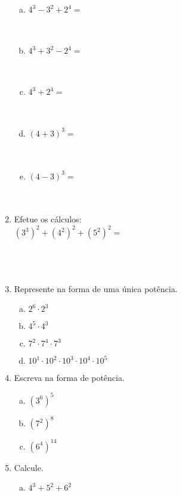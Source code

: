\documentclass[a4paper,14pt]{article}
\begin{document}
\begin{multicols}{2}
\begin{enumerate}
\begin{enumerate}[a)]
            	\item $4^3 - 3^2 + 2^4 = $ \\\\\\
            	\item $4^3 + 3^2 - 2^4 = $ \\\\\\
            	\item $4^3 + 2^4 = $ \\\\\\
            	\item $(4 + 3)^3 = $ \\\\\\
            	\item $(4 - 3)^3 = $ \\\\\\
            \end{enumerate}
            \item Efetue os cálculos: \\
            $(3^3)^2 + (4^2)^2 + (5^2)^2 = $ \\\\\\\\
            \item Represente na forma de uma única potência.
            \begin{enumerate}[a)]
            	\item $2^6 \cdot 2^3$
            	\item $4^5 \cdot 4^3$
            	\item $7^2 \cdot 7^4 \cdot 7^3$
            	\item $10^1 \cdot 10^2 \cdot 10^3 \cdot 10^4 \cdot 10^5$
            \end{enumerate}
            \item Escreva na forma de potência.
            \begin{enumerate}[a)]
            	\item $(3^6)^5$
            	\item $(7^2)^8$
            	\item $(6^4)^14$
            \end{enumerate}
            \item Calcule.
            \begin{enumerate}[a)]
            	\item $4^3 + 5^2 + 6^2$

\end{enumerate}
\end{enumerate}
\end{multicols}
\end{document}
